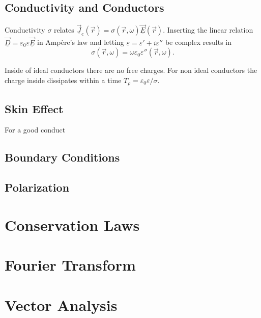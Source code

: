 \documentclass[margin=tiny]{hsrzf}
\newcommand{\cvec}[1]{\underline{\vec{#1}}}
\begin{document}
\subsection{Conductivity and Conductors}

Conductivity $\sigma$ relates $\cvec{J}_\text{c}(\vec{r}) = \sigma(\vec{r}, \omega)
\cvec{E}(\vec{r})$. Inserting the linear relation $\cvec{D} =
\varepsilon_0\varepsilon \cvec{E}$ in Ampère's law and letting $\varepsilon =
\varepsilon' + i\varepsilon''$
be complex results in
\[
  \sigma(\vec{r}, \omega) = \omega \varepsilon_0\varepsilon''(\vec{r},
  \omega).
\]

Inside of ideal conductors there are no free charges. For non ideal conductors
the charge inside dissipates within a time $T_\rho = \varepsilon_0\varepsilon
/ \sigma$.

\subsection{Skin Effect}

For a good conduct

\subsection{Boundary Conditions}
\subsection{Polarization}

\section{Conservation Laws}

\appendix

\section{Fourier Transform}

\section{Vector Analysis}
\end{document}
